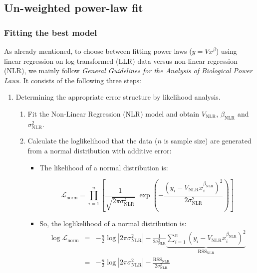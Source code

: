 \subsection*{Un-weighted power-law fit}\label{sec:unw}

\subsubsection*{Fitting the best model}

As already mentioned, to choose between fitting power laws ($y=Vx^\beta$) using linear regression on log-transformed (LLR) data versus non-linear regression (NLR), we mainly follow \emph{General Guidelines for the Analysis of Biological Power Laws}\cite{ecology}. It consists of the following three steps:
\begin{enumerate}
    \item Determining the appropriate error structure by likelihood analysis.
    \begin{enumerate}
        \item Fit the Non-Linear Regression (NLR) model and obtain $V_\text{NLR}$, $\beta_\text{NLR}$ and $\sigma_\text{NLR}^2$.
        \item Calculate the loglikelihood that the data ($n$ is sample size) are generated from a normal distribution with additive error:
        \begin{itemize}
            \item The likelihood of a normal distribution is: 
            \begin{linenomath}
            $$\mathcal{L}_\text{norm} = \prod_{i=1}^n\left[\frac{1}{\sqrt{2\pi\sigma^2_\text{NLR}}}\;\exp{\left(-\frac{\left(y_i-V_\text{NLR}x_i^{\beta_\text{NLR}}\right)^2}{2\sigma^2_\text{NLR}}\right)}\right]$$
            \end{linenomath}
            \item So, the loglikelihood of a normal distribution is:
            \begin{eqnarray*}
                \log\mathcal{L}_\text{norm} &=& -\frac{n}{2}\log\left|2\pi\sigma^2_\text{NLR}\right| - \frac{1}{2\sigma^2_\text{NLR}}\underbrace{\sum_{i=1}^n\left(y_i-V_\text{NLR}x_i^{\beta_\text{NLR}}\right)^2}_{\mathrm{RSS
                }_\text{NLR}}\\
                &=& -\frac{n}{2}\log\left|2\pi\sigma^2_\text{NLR}\right|-\frac{\mathrm{RSS}_\text{NLR}}{2\sigma^2_\text{NLR}}
            \end{eqnarray*}
        \end{itemize}

\end{enumerate}
\end{enumerate}
